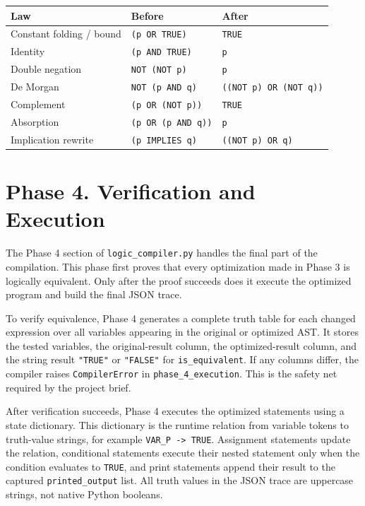 \documentclass[10pt]{article}
\begin{document}
\begin{center}
\begin{tabular}{L{0.28\textwidth} L{0.29\textwidth} L{0.29\textwidth}}
\toprule
Law & Before & After \\
\midrule
Constant folding / bound & \texttt{(p OR TRUE)} & \texttt{TRUE} \\
Identity & \texttt{(p AND TRUE)} & \texttt{p} \\
Double negation & \texttt{NOT (NOT p)} & \texttt{p} \\
De Morgan & \texttt{NOT (p AND q)} & \texttt{((NOT p) OR (NOT q))} \\
Complement & \texttt{(p OR (NOT p))} & \texttt{TRUE} \\
Absorption & \texttt{(p OR (p AND q))} & \texttt{p} \\
Implication rewrite & \texttt{(p IMPLIES q)} & \texttt{((NOT p) OR q)} \\
\bottomrule
\end{tabular}
\end{center}

\section{Phase 4. Verification and Execution}
The Phase 4 section of \texttt{logic\_compiler.py} handles the final part of the compilation. This phase first proves that every optimization made in Phase 3 is logically equivalent. Only after the proof succeeds does it execute the optimized program and build the final JSON trace.

To verify equivalence, Phase 4 generates a complete truth table for each changed expression over all variables appearing in the original or optimized AST. It stores the tested variables, the original-result column, the optimized-result column, and the string result \texttt{"TRUE"} or \texttt{"FALSE"} for \texttt{is\_equivalent}. If any columns differ, the compiler raises \texttt{CompilerError} in \texttt{phase\_4\_execution}. This is the safety net required by the project brief.

After verification succeeds, Phase 4 executes the optimized statements using a state dictionary. This dictionary is the runtime relation from variable tokens to truth-value strings, for example \texttt{VAR\_P -> TRUE}. Assignment statements update the relation, conditional statements execute their nested statement only when the condition evaluates to \texttt{TRUE}, and print statements append their result to the captured \texttt{printed\_output} list. All truth values in the JSON trace are uppercase strings, not native Python booleans.
\end{document}
